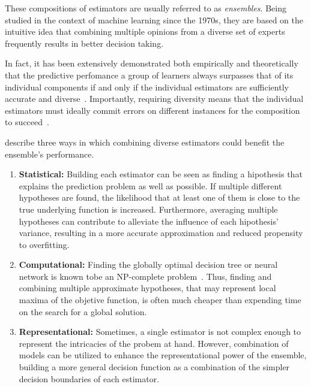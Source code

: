 These compositions of estimators are usually referred to as \emph{ensembles}. Being studied in the context of machine learning since the 1970s, they are based on the intuitive idea that combining multiple opinions from a diverse set of experts frequently results in better decision taking. %


In fact, it has been extensively demonstrated both empirically and theoretically that the predictive perfomance a group of learners always surpasses that of its individual components if and only if the individual estimators are sufficiently accurate and diverse~\cite{dieterich2000}.%
Importantly, requiring diversity means that the individual estimators must ideally commit errors on different instances for the composition to succeed~\cite{polikar2006ensemble}.

\citet{dietterich2000ensemble,polikar2006ensemble} describe three ways in which combining diverse estimators could benefit the ensemble's performance.

\begin{enumerate}
    \item \textbf{Statistical:} Building each estimator can be seen as finding a hipothesis that explains the prediction problem as well as possible. If multiple different hypotheses are found, the likelihood that at least one of them is close to the true underlying function is increased. Furthermore, averaging multiple hypotheses can contribute to alleviate the influence of each hipothesis' variance, resulting in a more accurate approximation and reduced propensity to overfitting.
    \item \textbf{Computational:} Finding the globally optimal decision tree or neural network is known tobe an NP-complete problem~\cite{}. Thus, finding and combining multiple approximate hypotheses, that may represent local maxima of the objetive function, is often much cheaper than expending time on the search for a global solution. %
    \item \textbf{Representational:} Sometimes, a single estimator is not complex enough to represent the intricacies of the probem at hand. However, combination of models can be utilized to enhance the representational power of the ensemble, building a more general decision function as a combination of the simpler decision boundaries of each estimator.  %
\end{enumerate}

